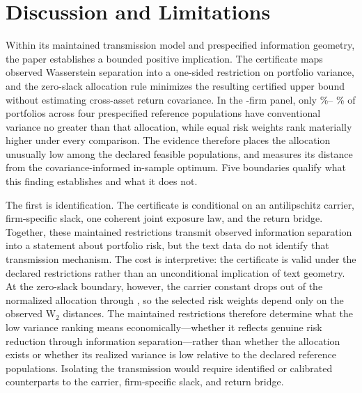\section{Discussion and Limitations}\label{sec:limitations}

Within its maintained transmission model and prespecified information geometry,
the paper establishes a bounded positive implication.
The certificate maps observed Wasserstein separation into a one-sided
restriction on portfolio variance, and the zero-slack allocation rule
minimizes the resulting certified upper bound without estimating cross-asset
return covariance.
In the -firm panel, only
\%--
\% of portfolios across
four prespecified reference populations have conventional variance no greater
than that allocation, while equal risk weights rank materially higher under
every comparison.
The evidence therefore places the allocation unusually low among the declared
feasible populations, and  measures its distance
from the covariance-informed in-sample optimum.
Five boundaries qualify what this finding establishes and what it does not.

The first is identification.
The certificate is conditional on an antilipschitz carrier, firm-specific
slack, one coherent joint exposure law, and the return bridge.
Together, these maintained restrictions transmit observed information
separation into a statement about portfolio risk, but the text data do not
identify that transmission mechanism.
The cost is interpretive: the certificate is valid under the declared
restrictions rather than an unconditional implication of text geometry.
At the zero-slack boundary, however, the carrier constant drops out of the
normalized allocation through , so the
selected risk weights depend only on the observed W$_2$ distances.
The maintained restrictions therefore determine what the low variance ranking
means economically---whether it reflects genuine risk reduction through
information separation---rather than whether the allocation exists or whether
its realized variance is low relative to the declared reference populations.
Isolating the transmission would require identified or calibrated counterparts
to the carrier, firm-specific slack, and return bridge.

